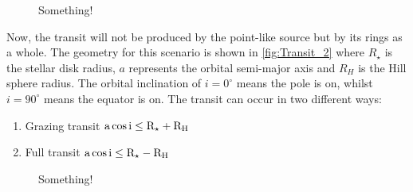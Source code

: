 \begin{figure}[!ht]
\centering
\caption{\scriptsize{Something!}}
\label{fig:Transit_1}
\end{figure}

Now, the transit will not be produced by the point-like source but by its rings as a whole. The geometry for this scenario is shown in \autoref{fig:Transit_2} where $R_\star$ is the stellar disk radius, $a$ represents the orbital semi-major axis and $R_H$ is the Hill sphere radius. The orbital inclination of $i = 0^\circ$ means the pole is on, whilst $i = 90^\circ$ means the equator is on. The transit can occur in two different ways:\\

\begin{enumerate}
\item Grazing transit $\textnormal{a}\cos \textnormal{i} \leq \textnormal{R}_\star + \textnormal{R}_\textnormal{H}$
\item Full transit $\textnormal{a}\cos \textnormal{i} \leq \textnormal{R}_\star - \textnormal{R}_\textnormal{H}$
\end{enumerate}

\begin{figure}[!ht]
\centering
\caption{\scriptsize{Something!}}
\label{fig:Transit_2}
\end{figure}

